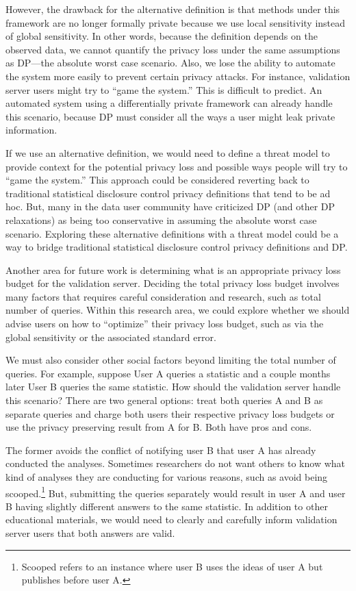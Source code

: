However, the drawback for the alternative definition is that methods under this framework are no longer formally private because we use local sensitivity instead of global sensitivity. In other words, because the definition depends on the observed data, we cannot quantify the privacy loss under the same assumptions as DP---the absolute worst case scenario. Also, we lose the ability to automate the system more easily to prevent certain privacy attacks. For instance, validation server users might try to ``game the system.'' This is difficult to predict. An automated system using a differentially private framework can already handle this scenario, because DP must consider all the ways a user might leak private information.

If we use an alternative definition, we would need to define a threat model to provide context for the potential privacy loss and possible ways people will try to ``game the system.'' This approach could be considered reverting back to traditional statistical disclosure control privacy definitions that tend to be ad hoc. But, many in the data user community have criticized DP (and other DP relaxations) as being too conservative in assuming the absolute worst case scenario. Exploring these alternative definitions with a threat model could be a way to bridge traditional statistical disclosure control privacy definitions and DP.

Another area for future work is determining what is an appropriate privacy loss budget for the validation server. Deciding the total privacy loss budget involves many factors that requires careful consideration and research, such as total number of queries. Within this research area, we could explore whether we should advise users on how to ``optimize'' their privacy loss budget, such as via the global sensitivity or the associated standard error.

We must also consider other social factors beyond limiting the total number of queries. For example, suppose User A queries a statistic and a couple months later User B queries the same statistic. How should the validation server handle this scenario? There are two general options: treat both queries A and B as separate queries and charge both users their respective privacy loss budgets or use the privacy preserving result from A for B. Both have pros and cons.

The former avoids the conflict of notifying user B that user A has already conducted the analyses. Sometimes researchers do not want others to know what kind of analyses they are conducting for various reasons, such as avoid being scooped.\footnote{Scooped refers to an instance where user B uses the ideas of user A but publishes before user A.} But, submitting the queries separately would result in user A and user B having slightly different answers to the same statistic. In addition to other educational materials, we would need to clearly and carefully inform validation server users that both answers are valid.

